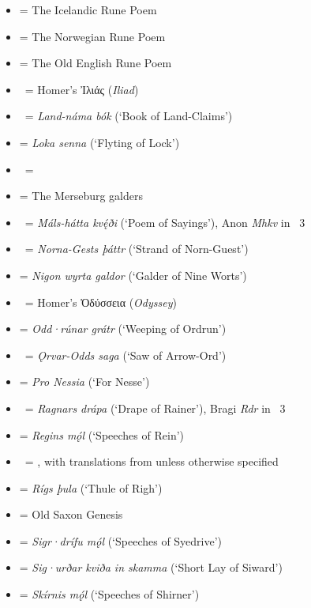 \begin{itemize}
	\item \textbf{} = The Icelandic Rune Poem
	\item \textbf{} = The Norwegian Rune Poem
	\item \textbf{} = The Old English Rune Poem
	\item \Iliad\ = Homer’s \textgreek{Ἰλιάς} (\emph{Iliad})
	\item \Landnamabok\ = \emph{Land-náma bók} (‘Book of Land-Claims’)
	\item \textbf{} = \emph{Loka senna} (‘Flyting of Lock’)
	\item \Mahabharata\ = 
	\item \textbf{} = The Merseburg galders
	\item \Malshattakvadi\ = \emph{Máls-hátta kvę́ði} (‘Poem of Sayings’), Anon \emph{Mhkv} in \Skp\ 3
	\item \Nornagest\ = \emph{Norna-Gests þáttr} (‘Strand of Norn-Guest’)
	\item \textbf{} = \emph{Nigon wyrta galdor} (‘Galder of Nine Worts’)
	\item \Odyssey\ = Homer’s \textgreek{Ὀδύσσεια} (\emph{Odyssey})
	\item \textbf{} = \emph{Odd·rúnar grátr} (‘Weeping of Ordrun’)
	\item \OrvarOddsSaga\ = \emph{Ǫrvar-Odds saga} (‘Saw of Arrow-Ord’)
	\item \textbf{} = \emph{Pro Nessia} (‘For Nesse’)
	\item \Ragnarsdrapa\ = \emph{Ragnars drápa} (‘Drape of Rainer’), Bragi \emph{Rdr} in \Skp\ 3
	\item \textbf{} = \emph{Regins mǫ́l} (‘Speeches of Rein’)
	\item \Rigveda\ = , with translations from \textcite{JamBrer2014} unless otherwise specified
	\item \textbf{} = \emph{Rígs þula} (‘Thule of Righ’)
	\item \textbf{} = Old Saxon Genesis
	\item \textbf{} = \emph{Sigr·drífu mǫ́l} (‘Speeches of Syedrive’)
	\item \textbf{} = \emph{Sig·urðar kviða in skamma} (‘Short Lay of Siward’)
	\item \textbf{} = \emph{Skírnis mǫ́l} (‘Speeches of Shirner’)

\end{itemize}
